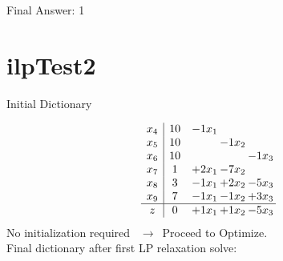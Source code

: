 \documentclass[11pt]{article}
\begin{document}
Final Answer: 1

\section{ilpTest2}

Initial Dictionary 

\[\begin{array}{c| c c@{\hskip 2pt} c@{\hskip 2pt} c@{\hskip 2pt} }
 x_{4}   &  10 & -1 x_{1} &    &   \\
 x_{5}   &  10  &   & -1 x_{2} &   \\
 x_{6}   &  10  &    &   & -1 x_{3}\\
 x_{7}   &  1 & + 2 x_{1} & -7 x_{2} &   \\
 x_{8}   &  3 & -1 x_{1} & + 2 x_{2} & -5 x_{3}\\
 x_{9}   &  7 & -1 x_{1} & -1 x_{2} & + 3 x_{3}\\
\hline
z    &  0 & + 1 x_{1} & + 1 x_{2} & -5 x_{3}\\
\end{array}\]
No initialization required \ $\rightarrow$\  Proceed to Optimize. \\ 
Final dictionary after first LP relaxation solve: 
\end{document}
